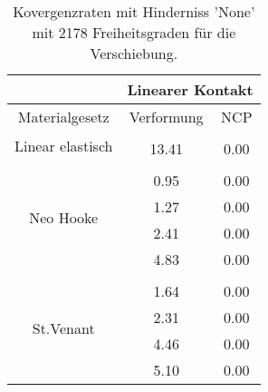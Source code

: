 \begin{table} 
\centering 
\begin{tabular}{c|cc|} 
\cline{2-3} 
 & \multicolumn{2}{|c|}{Linearer Kontakt} \\ 
\hline 
\multicolumn{1}{|c|}{Materialgesetz} & \multicolumn{1}{c|}{Verformung} & \multicolumn{1}{c|}{NCP} \\ 
\hline 
\multicolumn{1}{|c|}{\multirow{2}{*}{Linear elastisch}} &\multicolumn{1}{|c|}{} & \multicolumn{1}{|c|}{} \\ 
\multicolumn{1}{|c|}{} & \multicolumn{1}{|c|}{     13.41} & \multicolumn{1}{|c|}{      0.00} \\ 
\hline 
\multicolumn{1}{|c|}{\multirow{5}{*}{Neo Hooke}} &\multicolumn{1}{|c|}{} & \multicolumn{1}{|c|}{} \\ 
\multicolumn{1}{|c|}{} & \multicolumn{1}{|c|}{      0.95} & \multicolumn{1}{|c|}{      0.00} \\ 
\multicolumn{1}{|c|}{} & \multicolumn{1}{|c|}{      1.27} & \multicolumn{1}{|c|}{      0.00} \\ 
\multicolumn{1}{|c|}{} & \multicolumn{1}{|c|}{      2.41} & \multicolumn{1}{|c|}{      0.00} \\ 
\multicolumn{1}{|c|}{} & \multicolumn{1}{|c|}{      4.83} & \multicolumn{1}{|c|}{      0.00} \\ 
\hline 
\multicolumn{1}{|c|}{\multirow{5}{*}{St.Venant}} &\multicolumn{1}{|c|}{} & \multicolumn{1}{|c|}{} \\ 
\multicolumn{1}{|c|}{} & \multicolumn{1}{|c|}{      1.64} & \multicolumn{1}{|c|}{      0.00} \\ 
\multicolumn{1}{|c|}{} & \multicolumn{1}{|c|}{      2.31} & \multicolumn{1}{|c|}{      0.00} \\ 
\multicolumn{1}{|c|}{} & \multicolumn{1}{|c|}{      4.46} & \multicolumn{1}{|c|}{      0.00} \\ 
\multicolumn{1}{|c|}{} & \multicolumn{1}{|c|}{      5.10} & \multicolumn{1}{|c|}{      0.00} \\ 
\hline 
\end{tabular}\caption{Kovergenzraten mit Hinderniss 'None' mit 2178 Freiheitsgraden für die Verschiebung.}\label{tab:Rate_None_level4}
\end{table} 
